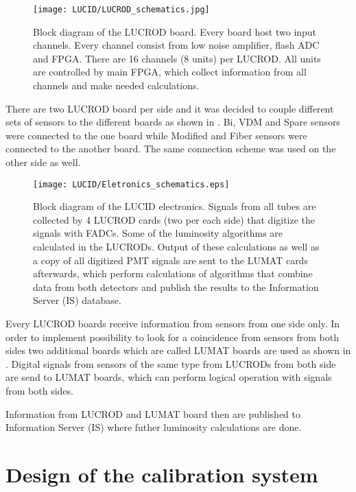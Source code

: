 \begin{figure}
\centering
\texttt{[image: LUCID/LUCROD\_schematics.jpg]}
\caption{Block diagram of the LUCROD board. Every board host two input channels. Every channel consist from low noise amplifier, flash ADC and FPGA. 
There are 16 channels (8 units) per LUCROD. All units are controlled by main FPGA, which collect information from all channels and make needed calculations.}
\label{fig:LUCROD_schematics}
\end{figure}

There are two LUCROD board per side and it was decided to couple different sets of sensors to the different boards as shown in .
Bi, VDM and Spare sensors were connected to the one board while Modified and Fiber sensors were connected to the another board.
The same connection scheme was used on the other side as well.

\begin{figure}
\centering
\texttt{[image: LUCID/Eletronics\_schematics.eps]}
\caption{Block diagram of the LUCID electronics. Signals from all tubes are collected by 4 \mbox{LUCROD} cards 
(two per 
each side) that digitize the signals with FADCs. Some of the luminosity algorithms are calculated in the LUCRODs. 
Output of these calculations as well as a copy of all digitized PMT 
signals are sent to the LUMAT cards afterwards, which perform calculations of algorithms that combine data from 
both detectors and publish the results to the Information Server (IS) database.}
\label{fig:Eletronics_schematics}
\end{figure}

Every LUCROD boards receive information from sensors from one side only.
In order to implement possibility to look for a coincidence from sensors from both sides two additional boards which are called LUMAT boards are used
as shown in .
Digital signals from sensors of the same type from LUCRODs from both side are send to LUMAT boards, which can perform logical operation with signals from both sides.

Information from LUCROD and LUMAT board then are published to Information Server (IS) where futher luminosity calculations are done.

\section{Design of the calibration system}

